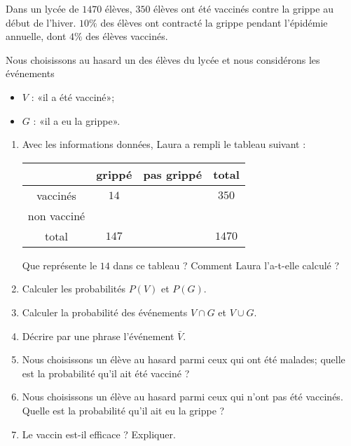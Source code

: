 

\begin{exercice}[\ldots/6]\label{exosmath-0716}

Dans un lycée de $1470$ élèves, \( 350\) élèves ont été vaccinés contre la grippe au début de l'hiver. \( 10\%\) des élèves ont contracté la grippe pendant l'épidémie annuelle, dont \( 4\%\) des élèves vaccinés.

    Nous choisissons au hasard un des élèves du lycée et nous considérons les événements 
    \begin{itemize}
        \item \( V\) : «il a été vacciné»; 
        \item \( G\) : «il a eu la grippe». 
    \end{itemize}
        

\begin{enumerate}
    \item

        Avec les informations données, Laura a rempli le tableau suivant :

\begin{center}
    \begin{tabular}[]{|c|c|c|c|}
        \hline
        &grippé&pas grippé&total\\
        \hline
        vaccinés&\( 14\)&&\( 350\)\\
        \hline
        non vacciné&&&\\
        \hline
        total&\( 147\)&&\( 1470\)\\
        \hline
    \end{tabular}
\end{center}

        Que représente le \( 14\) dans ce tableau ? Comment Laura l'a-t-elle calculé ?
    \item
        Calculer les probabilités \( P(V)\) et \( P(G)\).
    \item
        Calculer la probabilité des événements \( V\cap G\) et \( V\cup G\).
    \item
        Décrire par une phrase l'événement \( \bar V\).
    \item
        Nous choisissons un élève au hasard parmi ceux qui ont été malades; quelle est la probabilité qu'il ait été vacciné ?
    \item
        Nous choisissons un élève au hasard parmi ceux qui n'ont pas été vaccinés. Quelle est la probabilité qu'il ait eu la grippe ?
    \item
        Le vaccin est-il efficace ? Expliquer.
\end{enumerate}


\end{exercice}
